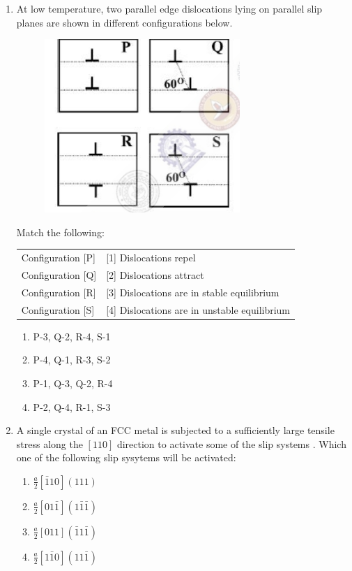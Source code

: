 \documentclass[journal]{IEEEtran}
\theoremstyle{remark}
\begin{document}
\begin{enumerate}
\item At low temperature, two parallel edge dislocations lying on parallel slip planes are shown in different configurations below.
\begin{figure}[H]
    \centering
    \includegraphics[width=0.5\columnwidth]{figs/Q.50.png}
    \caption{}
    \label{fig:placeholder}
\end{figure}
Match the following:
\begin{center}
\begin{tabular}{ll}
Configuration [P] & [1] Dislocations repel \\
Configuration [Q] & [2] Dislocations attract \\
Configuration [R] & [3] Dislocations are in stable equilibrium \\
Configuration [S] & [4] Dislocations are in unstable equilibrium \\
\end{tabular}
\end{center}
\begin{multicols}{2}
\begin{enumerate}
    \item P-3, Q-2, R-4, S-1
    \item P-4, Q-1, R-3, S-2
    \item P-1, Q-3, Q-2, R-4
    \item P-2, Q-4, R-1, S-3
\end{enumerate}
\end{multicols}

\item A single crystal of an FCC metal is subjected to a sufficiently large tensile stress along the $[110]$ direction to activate some of the slip systems . Which one of the following slip sysytems will be activated: \hfill{}
\begin{multicols}{4}
\begin{enumerate}
    \item $\frac{a}{2}[\bar{1}10](111)$
    \item $\frac{a}{2}[01\bar{1}](1\bar{1}\bar{1})$
    \item $\frac{a}{2}[011](\bar{1}1\bar{1})$
    \item $\frac{a}{2}[1\bar{1}0](11\bar{1})$
\end{enumerate}
\end{multicols}


\end{enumerate}
\end{document}
